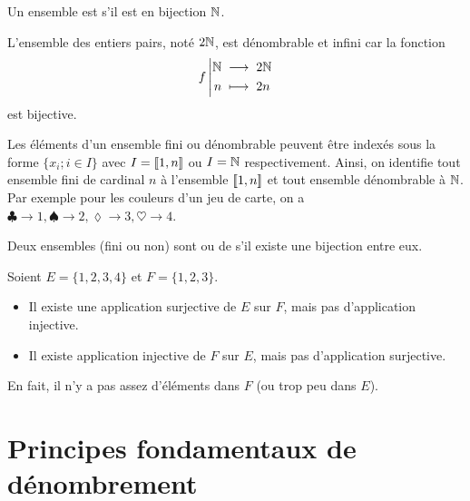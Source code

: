 \documentclass{book}
\begin{document}
\begin{Definition}[Dénombrable]
Un ensemble est  s'il est en bijection $\mathbb{N}$.
\end{Definition}
\begin{Exemple}L'ensemble des entiers pairs, noté $2\mathbb{N}$, est dénombrable et infini car la fonction
$$
{f}\left|\begin{aligned}{\mathbb{N}}&\;\longrightarrow\;{2\mathbb{N}}\\{n}&\;\longmapsto\;{2n}\end{aligned}\right.
$$ 
est bijective.
\end{Exemple}
\begin{Remarque}\label{rq_index}
Les éléments d'un ensemble fini ou dénombrable peuvent être indexés  sous la forme $\{x_i ; i\in I \}$ avec $I=\mathopen\lbrack\!\lbrack1,n \mathclose\rbrack\!\rbrack$ ou $I=\mathbb{N}$ respectivement. Ainsi, on identifie tout ensemble fini de cardinal $n$ à l'ensemble $\mathopen\lbrack\!\lbrack1,n \mathclose\rbrack\!\rbrack$ et tout ensemble dénombrable à $\mathbb{N}$. Par exemple pour les couleurs d'un jeu de carte, on a $\clubsuit \rightarrow 1, \spadesuit \rightarrow 2,  \lozenge \rightarrow 3,  \heartsuit \rightarrow 4 $.   
\end{Remarque}


\begin{Definition}[Équipotent] Deux ensembles (fini ou non) sont  ou de  s'il existe une bijection entre eux. 
\end{Definition}



\begin{Exemple}Soient $E=\{1,2,3,4\}$ et $F=\{1,2,3\}$. 
\begin{itemize}
\item Il existe une application surjective de $E$ sur $F$, mais pas d'application injective. 
\item Il existe application injective de $F$ sur $E$, mais pas d'application surjective. 
\end{itemize}
En fait, il n'y a pas assez d'éléments dans $F$ (ou trop peu dans $E$). 
\end{Exemple} 


\section{Principes fondamentaux de dénombrement}
\end{document}
